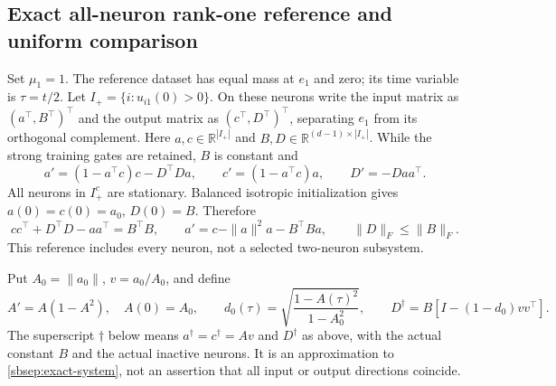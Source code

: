 \documentclass[11pt]{article}
\theoremstyle{remark}
\begin{document}
\subsection{Exact all-neuron rank-one reference and uniform comparison}

Set $\mu_1=1$. The reference dataset has equal mass at $e_1$ and zero;
its time variable is $\tau=t/2$. Let $I_+=\{i:u_{i1}(0)>0\}$.
On these neurons write the input matrix as $(a^\top,B^\top)^\top$ and
the output matrix as $(c^\top,D^\top)^\top$, separating $e_1$ from its
orthogonal complement. Here $a,c\in\mathbb R^{|I_+|}$ and
$B,D\in\mathbb R^{(d-1)\times|I_+|}$. While the strong training gates
are retained, $B$ is constant and
\begin{equation}\label{sbsep:exact-system}
 a'=(1-a^\top c)c-D^\top Da,\qquad
 c'=(1-a^\top c)a,\qquad D'=-Daa^\top.
\end{equation}
All neurons in $I_+^c$ are stationary. Balanced isotropic initialization
gives $a(0)=c(0)=a_0$, $D(0)=B$. Therefore
\begin{equation}\label{sbsep:gram}
 cc^\top+D^\top D-aa^\top=B^\top B,\qquad
 a'=c-\|a\|^2a-B^\top Ba,\qquad \|D\|_F\le\|B\|_F.
\end{equation}
This reference includes every neuron, not a selected two-neuron subsystem.

Put $A_0=\|a_0\|$, $v=a_0/A_0$, and define
\begin{equation}\label{sbsep:scalar-reference}
 A'=A(1-A^2),\quad A(0)=A_0,\qquad
 d_0(\tau)=\sqrt{\frac{1-A(\tau)^2}{1-A_0^2}},\qquad
 D^\dagger=B[I-(1-d_0)vv^\top].
\end{equation}
The superscript $\dagger$ below means $a^\dagger=c^\dagger=Av$ and
$D^\dagger$ as above, with the actual constant $B$ and the actual inactive
neurons. It is an approximation to \eqref{sbsep:exact-system}, not an
assertion that all input or output directions coincide.
\end{document}
